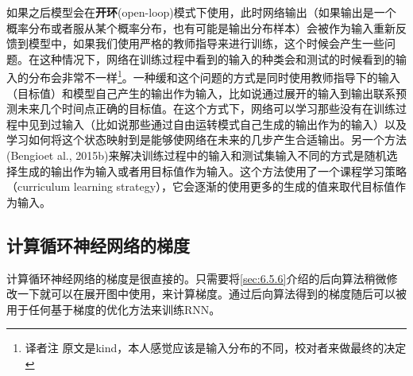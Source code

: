 如果之后模型会在\textbf{开环}(open-loop)模式下使用，此时网络输出（如果输出是一个概率分布或者服从某个概率分布，也有可能是输出分布样本）会被作为输入重新反馈到模型中，如果我们使用严格的教师指导来进行训练，这个时候会产生一些问题。在这种情况下，网络在训练过程中看到的输入的种类会和测试的时候看到的输入的分布会非常不一样\footnote{译者注 原文是kind，本人感觉应该是输入分布的不同，校对者来做最终的决定}。一种缓和这个问题的方式是同时使用教师指导下的输入（目标值）和模型自己产生的输出作为输入，比如说通过展开的输入到输出联系预测未来几个时间点正确的目标值。在这个方式下，网络可以学习那些没有在训练过程中见到过输入（比如说那些通过自由运转模式自己生成的输出作为的输入）以及学习如何将这个状态映射到是能够使网络在未来的几步产生合适输出。另一个方法(Bengioet al., 2015b)来解决训练过程中的输入和测试集输入不同的方式是随机选择生成的输出作为输入或者用目标值作为输入。这个方法使用了一个课程学习策略（curriculum learning strategy），它会逐渐的使用更多的生成的值来取代目标值作为输入。

\subsection{计算循环神经网络的梯度}
\label{sec:10.2.2}
计算循环神经网络的梯度是很直接的。只需要将\ref{sec:6.5.6}介绍的后向算法稍微修改一下就可以在展开图中使用，来计算梯度。通过后向算法得到的梯度随后可以被用于任何基于梯度的优化方法来训练RNN。

